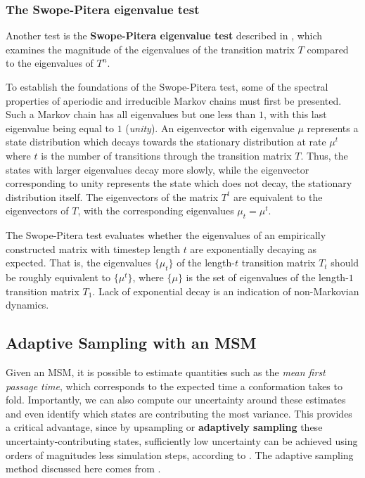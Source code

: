 \documentclass{article}
\begin{document}
\subsubsection{The Swope-Pitera eigenvalue test}
Another test is the \textbf{Swope-Pitera eigenvalue test} described in \cite{swopepitera}, which examines the magnitude of the eigenvalues of the transition matrix $T$ compared to the eigenvalues of $T^n$. 

To establish the foundations of the Swope-Pitera test, some of the spectral properties of aperiodic and irreducible Markov chains must first be presented. Such a Markov chain has all eigenvalues but one less than $1$, with this last eigenvalue being equal to $1$ (\textit{unity}). An eigenvector with eigenvalue $\mu$ represents a state distribution which decays towards the stationary distribution at rate $\mu^t$ where $t$ is the number of transitions through the transition matrix $T$. Thus, the states with larger eigenvalues decay more slowly, while the eigenvector corresponding to unity represents the state which does not decay, the stationary distribution itself. The eigenvectors of the matrix $T^t$ are equivalent to the eigenvectors of $T$, with the corresponding eigenvalues $\mu_t = \mu^t$.

The Swope-Pitera test evaluates whether the eigenvalues of an empirically constructed matrix with timestep length $t$ are exponentially decaying as expected. That is, the eigenvalues $\{\mu_t\}$ of the length-$t$ transition matrix $T_t$ should be roughly equivalent to $\{\mu^t\}$, where $\{\mu\}$ is the set of eigenvalues of the length-$1$ transition matrix $T_1$. Lack of exponential decay is an indication of non-Markovian dynamics.

\subsection{Adaptive Sampling with an MSM}
Given an MSM, it is possible to estimate quantities such as the \textit{mean first passage time}, which corresponds to the expected time a conformation takes to fold. Importantly, we can also compute our uncertainty around these estimates and even identify which states are contributing the most variance. This provides a critical advantage, since by upsampling or \textbf{adaptively sampling} these uncertainty-contributing states, sufficiently low uncertainty can be achieved using orders of magnitudes less simulation steps, according to \cite{pande2010}. The adaptive sampling method discussed here comes from \cite{adaptivesampling}.
\end{document}
